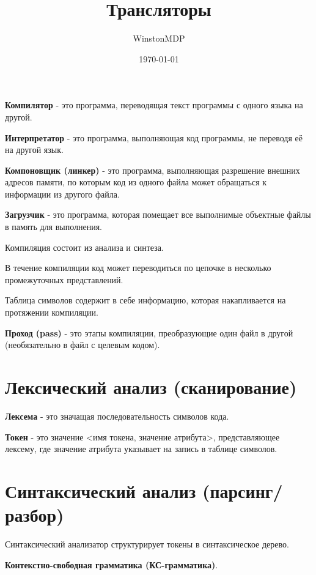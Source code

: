\documentclass[oneside]{book}
\title{Трансляторы}
\date{\today}
\author{WinstonMDP}
\begin{document}
    \maketitle

    \tableofcontents

    \chapter{}
    \textbf{Компилятор} - это программа,
    переводящая текст программы
    с одного языка на другой.

    \textbf{Интерпретатор} - это программа,
    выполняющая код программы,
    не переводя её на другой язык.

    \textbf{Компоновщик (линкер)} - это программа,
    выполняющая разрешение внешних
    адресов памяти, по которым код из одного
    файла может обращаться к информации из другого файла.

    \textbf{Загрузчик} - это программа,
    которая помещает все выполнимые
    объектные файлы в память для
    выполнения.

    Компиляция состоит из анализа и синтеза.

    В течение компиляции код может
    переводиться по цепочке в несколько
    промежуточных представлений.

    Таблица символов содержит в себе информацию,
    которая накапливается на протяжении компиляции.

    \textbf{Проход (pass)} - это этапы компиляции,
    преобразующие один файл в другой
    (необязательно в файл с целевым кодом).

    \chapter{Лексический анализ (сканирование)}
    \textbf{Лексема} - это значащая последовательность символов кода.

    \textbf{Токен} - это значение <имя токена, значение атрибута>,
    представляющее лексему, где значение атрибута
    указывает на запись в таблице символов.

    \chapter{Синтаксический анализ (парсинг/разбор)}
    Синтаксический анализатор структурирует токены в синтаксическое дерево.

    \textbf{Контекстно-свободная грамматика (КС-грамматика)}.
\end{document}
